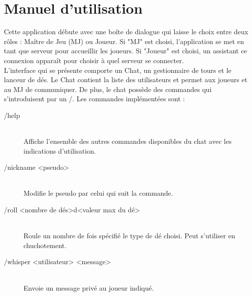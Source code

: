\documentclass[11pt]{article}
\begin{document}
\section{Manuel d'utilisation}

Cette application débute avec une boîte de dialogue qui laisse le choix entre deux rôles : Maître de Jeu (MJ) ou Joueur. Si "MJ" est choisi, l'application se met en tant que serveur pour accueillir les joueurs. Si "Joueur" est choisi, un assistant ce connexion apparaît pour choisir à quel serveur se connecter. \\

L'interface qui se présente comporte un Chat, un gestionnaire de tours et le lanceur de dés. Le Chat contient la liste des utilisateurs et permet aux joueurs et au MJ de communiquer. De plus, le chat possède des commandes qui s'introduisent par un /. Les commandes implémentées sont :

\begin{description}
	\item[/help] \hfill \\
		Affiche l'ensemble des autres commandes disponibles du chat avec les indications d'utilisation.
	\item[/nickname <pseudo>] \hfill \\
		Modifie le pseudo par celui qui suit la commande.
	\item[/roll <nombre de dés>d<valeur max du dé>] \hfill \\
		Roule un nombre de fois  spécifié le type de dé choisi. Peut s'utiliser en chuchotement.
	\item[/whisper <utilisateur> <message>] \hfill \\
		Envoie un message privé au joueur indiqué.
\end{description}
\end{document}
